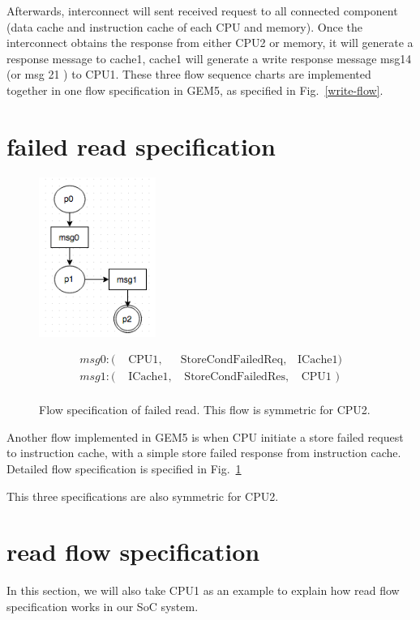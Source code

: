\documentclass[conference]{IEEEtran}
\begin{document}
 Afterwards, interconnect will sent received request to all connected component (data cache and instruction cache of each CPU and memory). Once the interconnect obtains the response from either CPU2 or memory, it will generate a response message to cache1, cache1 will generate a write response message msg14 (or msg 21 ) to CPU1. These three flow sequence charts are implemented together in one flow specification in GEM5, as specified in Fig.~\ref{write-flow}.
 
 
 \section{failed read specification}

\begin{figure} 
 \includegraphics[width=1.5in]{figures/storeFail.png}
 
 {\footnotesize
 \[
 \begin{array}{llll}
 msg0: (&\mbox{ CPU1},&\mbox{StoreCondFailedReq},&\mbox{ICache1})\\                   
 msg1: (&\mbox{ ICache1},&\mbox{ StoreCondFailedRes},&\mbox{ CPU1 })\\
 \end{array}
 \]}
 \caption{Flow specification of failed read. This flow is symmetric for CPU2. }
 \label{storefail}
 
 \end{figure}
Another flow implemented in GEM5 is when CPU initiate a store failed request to instruction cache, with a simple store failed response from instruction cache. Detailed flow specification is specified in Fig.~\ref{storefail}

This three specifications are also symmetric for CPU2.

 
 
 \section{read flow specification}
 In this section, we will also take CPU1 as an example to explain how read flow specification works in our SoC system.
\end{document}
